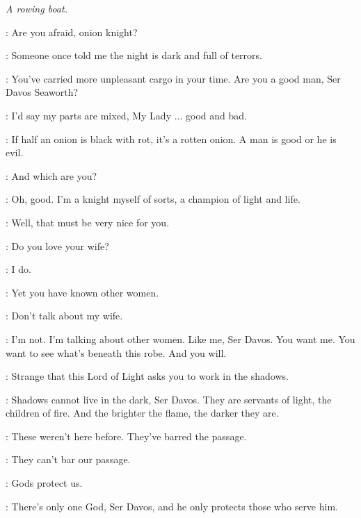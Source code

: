 \scene

\textit{A rowing boat.} 


\MELISANDRE: Are you afraid, onion knight? 

\DAVOS: Someone once told me the night is dark and full of terrors. 

\MELISANDRE: You've carried more unpleasant cargo in your time. Are you a good man, Ser Davos Seaworth? 

\DAVOS: I'd say my parts are mixed, My Lady $\ldots$ good and bad. 

\MELISANDRE: If half an onion is black with rot, it's a rotten onion. A man is good or he is evil. 

\DAVOS: And which are you?

\MELISANDRE: Oh, good. I'm a knight myself of sorts, a champion of light and life. 

\DAVOS: Well, that must be very nice for you. 

\MELISANDRE: Do you love your wife? 

\DAVOS: I do. 

\MELISANDRE: Yet you have known other women. 

\DAVOS: Don't talk about my wife. 


\MELISANDRE: I'm not. I'm talking about other women. Like me, Ser Davos. You want me. You want to see what's beneath this robe. And you will. 

\DAVOS: Strange that this Lord of Light asks you to work in the shadows. 


\MELISANDRE: Shadows cannot live in the dark, Ser Davos. They are servants of light, the children of fire. And the brighter the flame, the darker they are. 


\DAVOS: These weren't here before. They've barred the passage. 

\MELISANDRE: They can't bar our passage. 


\DAVOS: Gods protect us. 

\MELISANDRE: There's only one God, Ser Davos, and he only protects those who serve him. 




